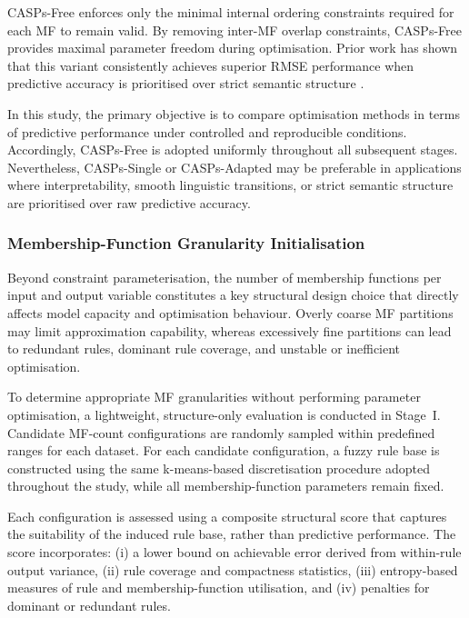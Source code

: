 \documentclass[conference]{IEEEtran}
\begin{document}
CASPs-Free enforces only the minimal internal ordering constraints required for
each MF to remain valid.
By removing inter-MF overlap constraints, CASPs-Free provides maximal parameter
freedom during optimisation.
Prior work has shown that this variant consistently achieves superior RMSE
performance when predictive accuracy is prioritised over strict semantic
structure \cite{chen2025casp}.

In this study, the primary objective is to compare optimisation methods in terms
of predictive performance under controlled and reproducible conditions.
Accordingly, CASPs-Free is adopted uniformly throughout all subsequent stages.
Nevertheless, CASPs-Single or CASPs-Adapted may be preferable in applications
where interpretability, smooth linguistic transitions, or strict semantic
structure are prioritised over raw predictive accuracy.

\subsubsection{Membership-Function Granularity Initialisation}

Beyond constraint parameterisation, the number of membership functions per input
and output variable constitutes a key structural design choice that directly
affects model capacity and optimisation behaviour.
Overly coarse MF partitions may limit approximation capability, whereas
excessively fine partitions can lead to redundant rules, dominant rule coverage,
and unstable or inefficient optimisation.

To determine appropriate MF granularities without performing parameter
optimisation, a lightweight, structure-only evaluation is conducted in
Stage~I.
Candidate MF-count configurations are randomly sampled within predefined ranges
for each dataset.
For each candidate configuration, a fuzzy rule base is constructed using the
same k-means-based discretisation procedure adopted throughout the study, while
all membership-function parameters remain fixed.

Each configuration is assessed using a composite structural score that captures
the suitability of the induced rule base, rather than predictive performance.
The score incorporates:
(i) a lower bound on achievable error derived from within-rule output variance,
(ii) rule coverage and compactness statistics,
(iii) entropy-based measures of rule and membership-function utilisation, and
(iv) penalties for dominant or redundant rules.
\end{document}
